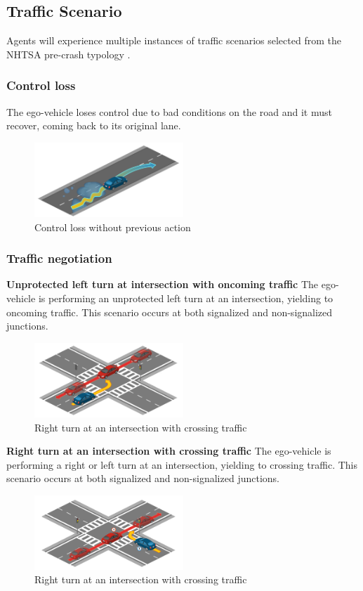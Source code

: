 \documentclass{article}
\begin{document}
\subsection{Traffic Scenario}
Agents will experience multiple instances of traffic scenarios selected from the NHTSA pre-crash typology \cite{NHTSA}. 

\subsubsection{Control loss}
The ego-vehicle loses control due to bad conditions on the road and it must recover, coming back to its original lane.
\begin{figure}[h]
    \centering
    \includegraphics[width=0.5\textwidth]{img/TR01.png}
    \caption{Control loss without previous action} \label{Scenario_controlLoss}
\end{figure}

\subsubsection{Traffic negotiation}
\textbf{Unprotected left turn at intersection with oncoming traffic}
The ego-vehicle is performing an unprotected left turn at an intersection, yielding to oncoming traffic. This scenario occurs at both signalized and non-signalized junctions.
\begin{figure}[h]
    \centering
    \includegraphics[width=0.5\textwidth]{img/TR08.png}
    \caption{Right turn at an intersection with crossing traffic} \label{Scenario_trafficNegtiation}
\end{figure}

\textbf{Right turn at an intersection with crossing traffic} 
The ego-vehicle is performing a right or left turn at an intersection, yielding to crossing traffic. This scenario occurs at both signalized and non-signalized junctions.
\begin{figure}[h]
    \centering
    \includegraphics[width=0.5\textwidth]{img/TR09.png}
    \caption{Right turn at an intersection with crossing traffic} \label{Scenario_trafficNegtiation}
\end{figure}
\end{document}
